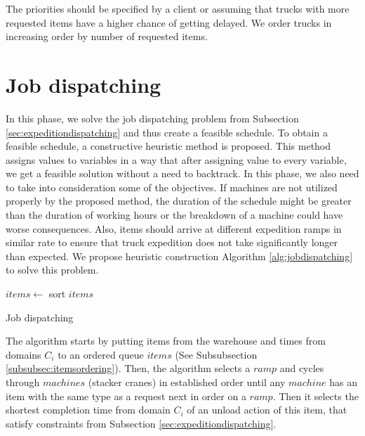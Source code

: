 \documentclass{ctuthesis}
\begin{document}
The priorities should be specified by a client or assuming that trucks with more requested items have a higher chance of getting delayed. We order trucks in increasing order by number of requested items.

\section{Job dispatching}
\label{sec:jobdispatching}

In this phase, we solve the job dispatching problem from Subsection \ref{sec:expeditiondispatching} and thus create a feasible schedule.
To obtain a feasible schedule, a constructive heuristic method is proposed. This method assigns values to variables in a way that after assigning value to every variable, we get a feasible solution without a need to backtrack. 
In this phase, we also need to take into consideration some of the objectives. If machines are not utilized properly by the proposed method, the duration of the schedule might be greater than the duration of working hours or the breakdown of a machine could have worse consequences. Also, items should arrive at different expedition ramps in similar rate to ensure that truck expedition does not take significantly longer than expected. We propose heuristic construction Algorithm \ref{alg:jobdispatching} to solve this problem.
 
\begin{algorithm}[h]
\SetAlgoLined
{}
  $items \leftarrow$ sort $items$\;
\caption{Job dispatching}
\label{alg:jobdispatching}
\end{algorithm}

The algorithm starts by putting items from the warehouse and times from domains $C_i$ to an ordered queue $items$ (See Subsubsection \ref{subsubsec:itemsordering}). Then, the algorithm selects a $ramp$ and cycles through $machines$ (stacker cranes) in established order until any $machine$ has an item with the same type as a request next in order on a $ramp$. Then it selects the shortest completion time from domain $C_i$ of an unload action of this item, that satisfy constraints from Subsection \ref{sec:expeditiondispatching}. 
\end{document}
